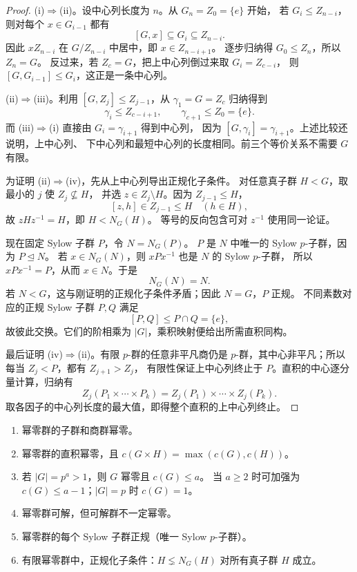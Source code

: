 \begin{proof}
(i)$\Rightarrow$(ii)。设中心列长度为 $n$。从 $G_n=Z_0=\{e\}$ 开始，
若 $G_i\le Z_{n-i}$，则对每个 $x\in G_{i-1}$ 都有
\[
[G,x]\subseteq G_i\subseteq Z_{n-i}.
\]
因此 $xZ_{n-i}$ 在 $G/Z_{n-i}$ 中居中，即 $x\in Z_{n-i+1}$。
逐步归纳得 $G_0\le Z_n$，所以 $Z_n=G$。
反过来，若 $Z_c=G$，把上中心列倒过来取 $G_i=Z_{c-i}$，
则 $[G,G_{i-1}]\le G_i$，这正是一条中心列。

(ii)$\Rightarrow$(iii)。利用 $[G,Z_j]\le Z_{j-1}$，从
$\gamma_1=G=Z_c$ 归纳得到
\[
\gamma_i\le Z_{c-i+1},\qquad
\gamma_{c+1}\le Z_0=\{e\}.
\]
而 (iii)$\Rightarrow$(i) 直接由 $G_i=\gamma_{i+1}$ 得到中心列，
因为 $[G,\gamma_i]=\gamma_{i+1}$。上述比较还说明，上中心列、
下中心列和最短中心列的长度相同。前三个等价关系不需要 $G$ 有限。

为证明 (ii)$\Rightarrow$(iv)，先从上中心列导出正规化子条件。
对任意真子群 $H<G$，取最小的 $j$ 使 $Z_j\nsubseteq H$，
并选 $z\in Z_j\setminus H$。因为 $Z_{j-1}\le H$，
\[
[z,h]\in Z_{j-1}\le H\quad(h\in H),
\]
故 $zHz^{-1}=H$，即 $H<N_G(H)$。
等号的反向包含可对 $z^{-1}$ 使用同一论证。

现在固定 Sylow 子群 $P$，令 $N=N_G(P)$。
$P$ 是 $N$ 中唯一的 Sylow $p$-子群，因为 $P\mathrel{\trianglelefteq}N$。
若 $x\in N_G(N)$，则 $xPx^{-1}$ 也是 $N$ 的 Sylow $p$-子群，
所以 $xPx^{-1}=P$，从而 $x\in N$。于是
\[
N_G(N)=N.
\]
若 $N<G$，这与刚证明的正规化子条件矛盾；因此 $N=G$，$P$ 正规。
不同素数对应的正规 Sylow 子群 $P,Q$ 满足
\[
[P,Q]\le P\cap Q=\{e\},
\]
故彼此交换。它们的阶相乘为 $|G|$，乘积映射便给出所需直积同构。

最后证明 (iv)$\Rightarrow$(ii)。有限 $p$-群的任意非平凡商仍是
$p$-群，其中心非平凡；所以每当 $Z_j<P$，都有 $Z_{j+1}>Z_j$，
有限性保证上中心列终止于 $P$。直积的中心逐分量计算，归纳有
\[
Z_j(P_1\times\cdots\times P_k)
=Z_j(P_1)\times\cdots\times Z_j(P_k).
\]
取各因子的中心列长度的最大值，即得整个直积的上中心列终止。
\end{proof}

\begin{proposition}[幂零群的基本性质]
\label{prop:nilpotent-properties}
\begin{enumerate}[label=(\roman*),leftmargin=3em]
\item 幂零群的子群和商群幂零。
\item 幂零群的直积幂零，且 $c(G\times H)=\max(c(G),c(H))$。
\item 若 $|G|=p^a>1$，则 $G$ 幂零且 $c(G)\le a$。
当 $a\ge2$ 时可加强为 $c(G)\le a-1$；$|G|=p$ 时 $c(G)=1$。
\item 幂零群可解，但可解群不一定幂零。
\item 幂零群的每个 Sylow 子群正规（唯一 Sylow $p$-子群）。
\item 有限幂零群中，正规化子条件：$H\lneq N_G(H)$ 对所有真子群 $H$ 成立。
\end{enumerate}
\end{proposition}

